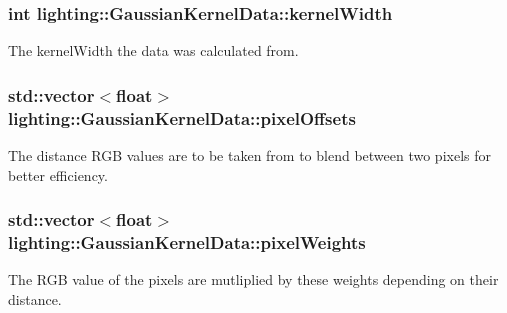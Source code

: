 \subsubsection[{\texorpdfstring{kernel\+Width}{kernelWidth}}]{\setlength{\rightskip}{0pt plus 5cm}int lighting\+::\+Gaussian\+Kernel\+Data\+::kernel\+Width}\hypertarget{classlighting_1_1GaussianKernelData_aa01d75bd479cc39c0ccc25f8ac8c015b}{}\label{classlighting_1_1GaussianKernelData_aa01d75bd479cc39c0ccc25f8ac8c015b}


The kernel\+Width the data was calculated from. 

\subsubsection[{\texorpdfstring{pixel\+Offsets}{pixelOffsets}}]{\setlength{\rightskip}{0pt plus 5cm}std\+::vector$<$float$>$ lighting\+::\+Gaussian\+Kernel\+Data\+::pixel\+Offsets}\hypertarget{classlighting_1_1GaussianKernelData_a2a8a08e1eb8b4e5f0c8bf42868cb8bc1}{}\label{classlighting_1_1GaussianKernelData_a2a8a08e1eb8b4e5f0c8bf42868cb8bc1}


The distance R\+GB values are to be taken from to blend between two pixels for better efficiency. 

\subsubsection[{\texorpdfstring{pixel\+Weights}{pixelWeights}}]{\setlength{\rightskip}{0pt plus 5cm}std\+::vector$<$float$>$ lighting\+::\+Gaussian\+Kernel\+Data\+::pixel\+Weights}\hypertarget{classlighting_1_1GaussianKernelData_a623d6a4fd0d92cee09f20020963fe468}{}\label{classlighting_1_1GaussianKernelData_a623d6a4fd0d92cee09f20020963fe468}


The R\+GB value of the pixels are mutliplied by these weights depending on their distance. 

